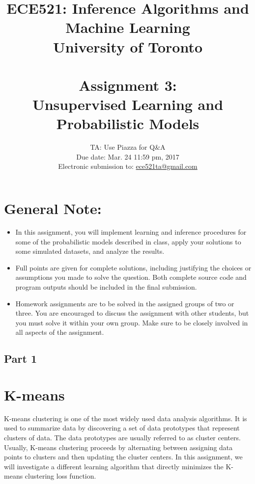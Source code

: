 \documentclass[12pt,letterpaper]{article}
\begin{document}
\title{\vspace{-4ex}ECE521: Inference Algorithms and Machine Learning \\
University of Toronto\\ \  \\
Assignment 3: \\Unsupervised Learning and Probabilistic Models}
\date{\vspace{-8ex}TA: Use Piazza for Q\&A \\ Due date: Mar. 24 11:59 pm, 2017 \\ Electronic submission to: \href{mailto:ece521ta@gmail.com}{ece521ta@gmail.com} }


\maketitle

\section*{General Note:}
\begin{itemize}
\item In this assignment, you will implement learning and inference procedures for some of the probabilistic models described in class, apply your solutions to some simulated datasets, and analyze the results.
\item Full points are given for complete solutions, including justifying the choices or assumptions you made to solve the question. Both complete source code and program outputs should be included in the final submission.
\item Homework assignments are to be solved in the assigned groups of two or three. You are encouraged to discuss the assignment with other students, but
you must solve it within your own group. Make sure to be closely involved in all aspects of the assignment.
\end{itemize}

\begin{mycomments}
\section{Part 1}
\end{mycomments}
\section{K-means}

K-means clustering is one of the most widely used data analysis algorithms. It is used to summarize data by discovering a set of data prototypes that represent clusters of data. The data prototypes are usually referred to as cluster centers. Usually, K-means clustering proceeds by alternating between assigning data points to clusters and then updating the cluster centers. In this assignment, we will investigate a different learning algorithm that directly minimizes the K-means clustering loss function.
\end{document}
